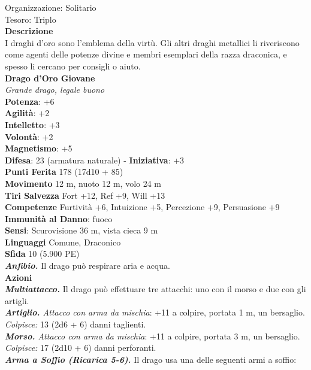 \begin{multicols}{2}
Organizzazione: Solitario\\
Tesoro: Triplo\\
\textbf{Descrizione}\\
I draghi d'oro sono l'emblema della virtù. Gli altri draghi metallici li riveriscono come agenti delle potenze divine e membri esemplari della razza draconica, e spesso li cercano per consigli o aiuto.\\
\medskip\textbf{Drago d'Oro Giovane}\\
\emph{Grande drago, legale buono}\\
\textbf{Potenza}: +6\\
\textbf{Agilità}: +2\\
\textbf{Intelletto}: +3\\
\textbf{Volontà}: +2\\
\textbf{Magnetismo}: +5\\
\textbf{Difesa}: 23 (armatura naturale) - \textbf{Iniziativa}: +3\\
\textbf{Punti Ferita} 178 (17d10 + 85)\\
\textbf{Movimento} 12 m, nuoto 12 m, volo 24 m\\
\textbf{Tiri Salvezza} Fort +12, Ref +9, Will +13\\
\textbf{Competenze} Furtività +6, Intuizione +5, Percezione +9, Persuasione +9 \\
\textbf{Immunità al Danno}: fuoco\\
\textbf{Sensi}: Scurovisione 36 m, vista cieca 9 m\\
\textbf{Linguaggi} Comune, Draconico\\
\textbf{Sfida} 10 (5.900 PE)\smallskip\\
\emph{\textbf{Anfibio.}} Il drago può respirare aria e acqua.\\
\smallskip\textbf{Azioni}\\
\emph{\textbf{Multiattacco.}} Il drago può effettuare tre attacchi: uno con il morso e due con gli artigli.\\
\emph{\textbf{Artiglio.} Attacco con arma da mischia}: +11 a colpire, portata 1 m, un bersaglio.\\
\emph{Colpisce:} 13 (2d6 + 6) danni taglienti.\\
\emph{\textbf{Morso.} Attacco con arma da mischia}: +11 a colpire, portata 3 m, un bersaglio.\\
\emph{Colpisce:} 17 (2d10 + 6) danni perforanti.\\
\emph{\textbf{Arma a Soffio (Ricarica 5-6).}} Il drago usa una delle seguenti armi a soffio:\\

\end{multicols}
